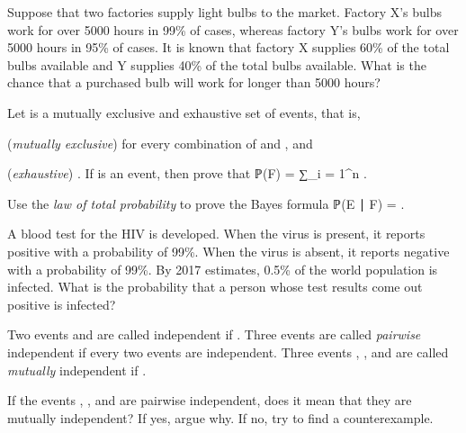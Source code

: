 	\stopsection


	\page


	\startsection [title={2019-06-26}]
		
		\startexercise [title={Bulb factory}]
			Suppose that two factories supply light bulbs to the market. Factory X's bulbs work for over 5000 hours in 99\% of cases, whereas factory Y's bulbs work for over 5000 hours in 95\% of cases. It is known that factory X supplies 60\% of the total bulbs available and Y supplies 40\% of the total bulbs available. What is the chance that a purchased bulb will work for longer than 5000 hours?
		\stopexercise

		\startexercise [title={Law of total probability}]
			Let  is a mutually exclusive and exhaustive set of events, that is,
			\startitemize [1, joinedup]
				\item  (\emph{mutually exclusive})   for every combination of  and , and
				\item  (\emph{exhaustive})  .
			\stopitemize
			If  is an event, then prove that
			\startformula
				ℙ(F)  =  ∑_{i = 1}^n \bsqr[ℙ(F ∣ E_i) ℙ(E_i)] .
			\stopformula 
		\stopexercise

		\startexercise [title={Bayes formula}]
			Use the \emph{law of total probability} to prove the Bayes formula
			\startformula
				ℙ(E ∣ F) =  .
			\stopformula
		\stopexercise

		\startexercise [title={Blood test}]
			A blood test for the HIV is developed.
			When the virus is present, it reports positive with a probability of 99\%.
			When the virus is absent, it reports negative with a probability of 99\%.
			By 2017 estimates, 0.5\% of the world population is infected.
			What is the probability that a person whose test results come out positive is infected?
		\stopexercise

		\startexercise [title={Mutual and pairwise independence}]
			Two events  and  are called independent if .
			Three events are called \emph{pairwise} independent if every two events are independent.
			Three events , , and  are called \emph{mutually} independent if .

			If the events , , and  are pairwise independent, does it mean that they are mutually independent?
			If yes, argue why. If no, try to find a counterexample.
		\stopexercise

